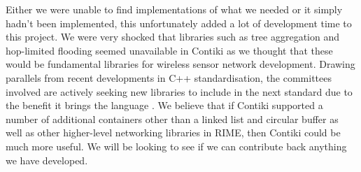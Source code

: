 Either we were unable to find implementations of what we needed or it simply hadn't been implemented, this unfortunately added a lot of development time to this project. We were very shocked that libraries such as tree aggregation and hop-limited flooding seemed unavailable in Contiki as we thought that these would be fundamental libraries for wireless sensor network development. Drawing parallels from recent developments in C++ standardisation, the committees involved are actively seeking new libraries to include in the next standard due to the benefit it brings the language \cite{c++call-for-proposals}. We believe that if Contiki supported a number of additional containers other than a linked list and circular buffer as well as other higher-level networking libraries in RIME, then Contiki could be much more useful. We will be looking to see if we can contribute back anything we have developed.

